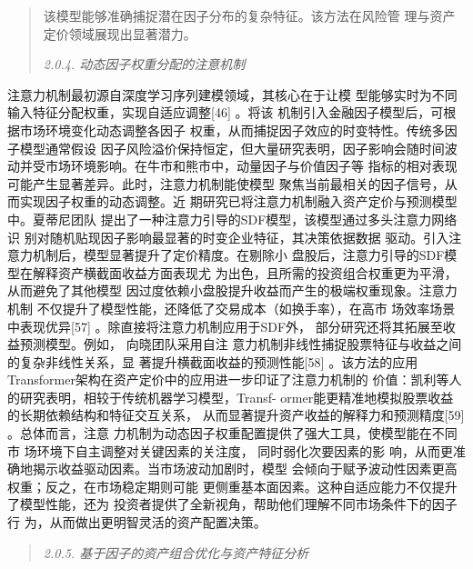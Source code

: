 \begin{quote}
该模型能够准确捕捉潜在因子分布的复杂特征。该方法在风险管
理与资产定价领域展现出显著潜力。

\emph{2.0.4. 动态因子权重分配的注意机制}
\end{quote}

注意力机制最初源自深度学习序列建模领域，其核心在于让模
型能够实时为不同输入特征分配权重，实现自适应调整{[}46{]} 。将该
机制引入金融因子模型后，可根据市场环境变化动态调整各因子
权重，从而捕捉因子效应的时变特性。传统多因子模型通常假设
因子风险溢价保持恒定，但大量研究表明，因子影响会随时间波
动并受市场环境影响。在牛市和熊市中，动量因子与价值因子等
指标的相对表现可能产生显著差异。此时，注意力机制能使模型
聚焦当前最相关的因子信号，从而实现因子权重的动态调整。近
期研究已将注意力机制融入资产定价与预测模型中。夏蒂尼团队
提出了一种注意力引导的SDF模型，该模型通过多头注意力网络识
别对随机贴现因子影响最显著的时变企业特征，其决策依据数据
驱动。引入注意力机制后，模型显著提升了定价精度。在剔除小
盘股后，注意力引导的SDF模型在解释资产横截面收益方面表现尤
为出色，且所需的投资组合权重更为平滑，从而避免了其他模型
因过度依赖小盘股提升收益而产生的极端权重现象。注意力机制
不仅提升了模型性能，还降低了交易成本（如换手率），在高市
场效率场景中表现优异{[}57{]} 。除直接将注意力机制应用于SDF外，
部分研究还将其拓展至收益预测模型。例如， 向晓团队采用自注
意力机制非线性捕捉股票特征与收益之间的复杂非线性关系，显
著提升横截面收益的预测性能{[}58{]}
。该方法的应用Transformer架构在资产定价中的应用进一步印证了注意力机制的
价值：凯利等人的研究表明，相较于传统机器学习模型，Transf-
ormer能更精准地模拟股票收益的长期依赖结构和特征交互关系，
从而显著提升资产收益的解释力和预测精度{[}59{]} 。总体而言，注意
力机制为动态因子权重配置提供了强大工具，使模型能在不同市
场环境下自主调整对关键因素的关注度， 同时弱化次要因素的影
响，从而更准确地揭示收益驱动因素。当市场波动加剧时，模型
会倾向于赋予波动性因素更高权重；反之，在市场稳定期则可能
更侧重基本面因素。这种自适应能力不仅提升了模型性能，还为
投资者提供了全新视角，帮助他们理解不同市场条件下的因子行
为，从而做出更明智灵活的资产配置决策。

\begin{quote}
\emph{2.0.5. 基于因子的资产组合优化与资产特征分析}
\end{quote}

